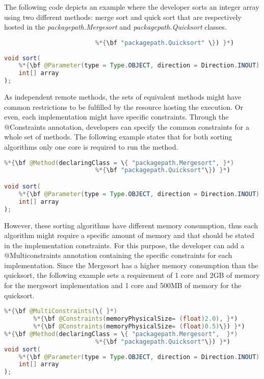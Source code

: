 \begin{itemize}
The following code depicts an example where the developer sorts an integer array using two different
methods: merge sort and quick sort that are respectively hosted in the {\it packagepath.Mergesort} and
{\it packagepath.Quicksort} classes.

\begin{lstlisting}[language=java]
%*{\bf @Method(declaringClass = \{ "packagepath.Mergesort", }*)
                         %*{\bf "packagepath.Quicksort" \}) }*)
                           
void sort(
    %*{\bf @Parameter(type = Type.OBJECT, direction = Direction.INOUT) }*)
    int[] array
);
\end{lstlisting}

As independent remote methods, the sets of equivalent methods might have common restrictions to be
fulfilled by the resource hosting the execution. Or even, each implementation might have specific constraints.
Through the @Constraints annotation, developers can specify the common constraints for a whole set of
methods. The following example states that for both sorting algorithms only one core is required to run the
method.

\begin{lstlisting}[language=java]
%*{\bf @Constraints(processorCoreCount = 1) }*)
%*{\bf @Method(declaringClass = \{ "packagepath.Mergesort", }*) 
                         %*{\bf "packagepath.Quicksort"\}) }*)

void sort(
    %*{\bf @Parameter(type = Type.OBJECT, direction = Direction.INOUT) }*)
    int[] array
);
\end{lstlisting}

However, these sorting algorithms have different memory consumption, thus each algorithm might require a
specific amount of memory and that should be stated in the implementation constraints. For this purpose, the
developer can add a @Multiconstraints annotation containing the specific constraints for each
implementation. Since the Mergesort has a higher memory consumption than the quicksort, the following
example sets a requirement of 1 core and 2GB of memory for the mergesort implementation and 1 core and
500MB of memory for the quicksort.

\begin{lstlisting}[language=java]
%*{\bf @Constraints(processorCoreCount = 1) }*)
%*{\bf @MultiConstraints(\{ }*)
        %*{\bf @Constraints(memoryPhysicalSize= (float)2.0), }*)
        %*{\bf @Constraints(memoryPhysicalSize= (float)0.5)\}) }*)
%*{\bf @Method(declaringClass = \{ "packagepath.Mergesort",  }*)
                         %*{\bf "packagepath.Quicksort"\}) }*)
void sort(
    %*{\bf @Parameter(type = Type.OBJECT, direction = Direction.INOUT) }*)
    int[] array
);
\end{lstlisting}


\end{itemize}
